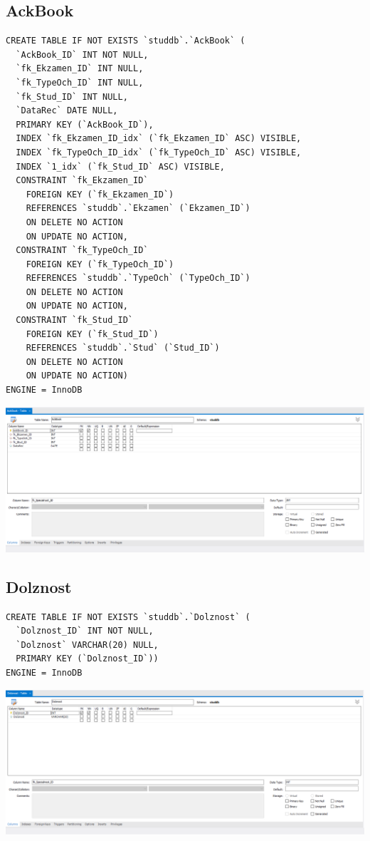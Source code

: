 \documentclass[a4paper, 12pt]{article}
\begin{document}
\subsection{AckBook}
\begin{lstlisting}
CREATE TABLE IF NOT EXISTS `studdb`.`AckBook` (
  `AckBook_ID` INT NOT NULL,
  `fk_Ekzamen_ID` INT NULL,
  `fk_TypeOch_ID` INT NULL,
  `fk_Stud_ID` INT NULL,
  `DataRec` DATE NULL,
  PRIMARY KEY (`AckBook_ID`),
  INDEX `fk_Ekzamen_ID_idx` (`fk_Ekzamen_ID` ASC) VISIBLE,
  INDEX `fk_TypeOch_ID_idx` (`fk_TypeOch_ID` ASC) VISIBLE,
  INDEX `1_idx` (`fk_Stud_ID` ASC) VISIBLE,
  CONSTRAINT `fk_Ekzamen_ID`
    FOREIGN KEY (`fk_Ekzamen_ID`)
    REFERENCES `studdb`.`Ekzamen` (`Ekzamen_ID`)
    ON DELETE NO ACTION
    ON UPDATE NO ACTION,
  CONSTRAINT `fk_TypeOch_ID`
    FOREIGN KEY (`fk_TypeOch_ID`)
    REFERENCES `studdb`.`TypeOch` (`TypeOch_ID`)
    ON DELETE NO ACTION
    ON UPDATE NO ACTION,
  CONSTRAINT `fk_Stud_ID`
    FOREIGN KEY (`fk_Stud_ID`)
    REFERENCES `studdb`.`Stud` (`Stud_ID`)
    ON DELETE NO ACTION
    ON UPDATE NO ACTION)
ENGINE = InnoDB  
\end{lstlisting}
\includegraphics[width=\textwidth]{2-2.png}

\subsection{Dolznost}
\begin{lstlisting}
CREATE TABLE IF NOT EXISTS `studdb`.`Dolznost` (
  `Dolznost_ID` INT NOT NULL,
  `Dolznost` VARCHAR(20) NULL,
  PRIMARY KEY (`Dolznost_ID`))
ENGINE = InnoDB
\end{lstlisting}
\includegraphics[width=\textwidth]{2-3.png}
\end{document}
